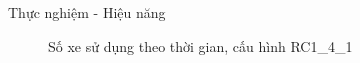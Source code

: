 \begin{frame}{Thực nghiệm - Hiệu năng}
  \begin{figure}
    \centering
    \quad
  \caption{Số xe sử dụng theo thời gian, cấu hình RC1\_4\_1}
  \end{figure}
\end{frame}
